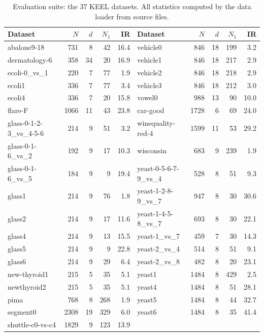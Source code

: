 \begin{table}[t]
\centering
\caption{Evaluation suite: the 37 KEEL datasets. All statistics computed by the data loader from source files.}
\label{tab:datasets}
\footnotesize
\setlength{\tabcolsep}{4pt}
\begin{tabular}{@{}lrrrr@{\hspace{6pt}}lrrrr@{}}
\toprule
Dataset & $N$ & $d$ & $N_1$ & IR & Dataset & $N$ & $d$ & $N_1$ & IR\\
\midrule
abalone9-18 & 731 & 8 & 42 & 16.4 & vehicle0 & 846 & 18 & 199 & 3.2 \\
dermatology-6 & 358 & 34 & 20 & 16.9 & vehicle1 & 846 & 18 & 217 & 2.9 \\
ecoli-0\_vs\_1 & 220 & 7 & 77 & 1.9 & vehicle2 & 846 & 18 & 218 & 2.9 \\
ecoli1 & 336 & 7 & 77 & 3.4 & vehicle3 & 846 & 18 & 212 & 3.0 \\
ecoli4 & 336 & 7 & 20 & 15.8 & vowel0 & 988 & 13 & 90 & 10.0 \\
flare-F & 1066 & 11 & 43 & 23.8 & car-good & 1728 & 6 & 69 & 24.0 \\
glass-0-1-2-3\_vs\_4-5-6 & 214 & 9 & 51 & 3.2 & winequality-red-4 & 1599 & 11 & 53 & 29.2 \\
glass-0-1-6\_vs\_2 & 192 & 9 & 17 & 10.3 & wisconsin & 683 & 9 & 239 & 1.9 \\
glass-0-1-6\_vs\_5 & 184 & 9 & 9 & 19.4 & yeast-0-5-6-7-9\_vs\_4 & 528 & 8 & 51 & 9.3 \\
glass1 & 214 & 9 & 76 & 1.8 & yeast-1-2-8-9\_vs\_7 & 947 & 8 & 30 & 30.6 \\
glass2 & 214 & 9 & 17 & 11.6 & yeast-1-4-5-8\_vs\_7 & 693 & 8 & 30 & 22.1 \\
glass4 & 214 & 9 & 13 & 15.5 & yeast-1\_vs\_7 & 459 & 7 & 30 & 14.3 \\
glass5 & 214 & 9 & 9 & 22.8 & yeast-2\_vs\_4 & 514 & 8 & 51 & 9.1 \\
glass6 & 214 & 9 & 29 & 6.4 & yeast-2\_vs\_8 & 482 & 8 & 20 & 23.1 \\
new-thyroid1 & 215 & 5 & 35 & 5.1 & yeast1 & 1484 & 8 & 429 & 2.5 \\
newthyroid2 & 215 & 5 & 35 & 5.1 & yeast4 & 1484 & 8 & 51 & 28.1 \\
pima & 768 & 8 & 268 & 1.9 & yeast5 & 1484 & 8 & 44 & 32.7 \\
segment0 & 2308 & 19 & 329 & 6.0 & yeast6 & 1484 & 8 & 35 & 41.4 \\
shuttle-c0-vs-c4 & 1829 & 9 & 123 & 13.9 &  & & & &  \\
\bottomrule
\end{tabular}
\end{table}
